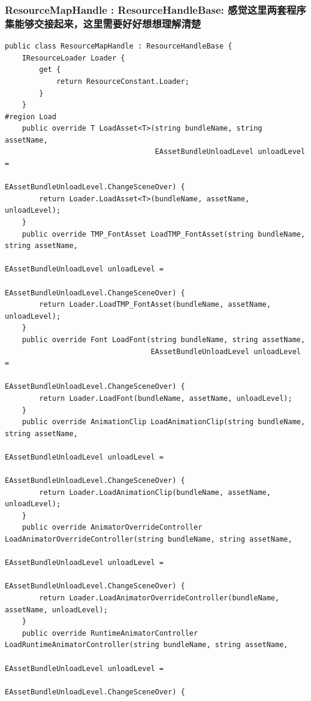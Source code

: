 \documentclass[9pt, b5paper]{article}
\begin{document}
\subsubsection{ResourceMapHandle : ResourceHandleBase: 感觉这里两套程序集能够交接起来，这里需要好好想想理解清楚}
\label{sec-9-1-3}
\begin{verbatim}
public class ResourceMapHandle : ResourceHandleBase {
    IResourceLoader Loader {
        get {
            return ResourceConstant.Loader;
        }
    }
#region Load
    public override T LoadAsset<T>(string bundleName, string assetName, 
                                   EAssetBundleUnloadLevel unloadLevel = 
                                   EAssetBundleUnloadLevel.ChangeSceneOver) {
        return Loader.LoadAsset<T>(bundleName, assetName, unloadLevel);
    }
    public override TMP_FontAsset LoadTMP_FontAsset(string bundleName, string assetName, 
                                                    EAssetBundleUnloadLevel unloadLevel = 
                                                    EAssetBundleUnloadLevel.ChangeSceneOver) {
        return Loader.LoadTMP_FontAsset(bundleName, assetName, unloadLevel);
    }
    public override Font LoadFont(string bundleName, string assetName, 
                                  EAssetBundleUnloadLevel unloadLevel = 
                                  EAssetBundleUnloadLevel.ChangeSceneOver) {
        return Loader.LoadFont(bundleName, assetName, unloadLevel);
    }
    public override AnimationClip LoadAnimationClip(string bundleName, string assetName, 
                                                    EAssetBundleUnloadLevel unloadLevel = 
                                                    EAssetBundleUnloadLevel.ChangeSceneOver) {
        return Loader.LoadAnimationClip(bundleName, assetName, unloadLevel);
    }
    public override AnimatorOverrideController LoadAnimatorOverrideController(string bundleName, string assetName, 
                                                                              EAssetBundleUnloadLevel unloadLevel = 
                                                                              EAssetBundleUnloadLevel.ChangeSceneOver) {
        return Loader.LoadAnimatorOverrideController(bundleName, assetName, unloadLevel);
    }
    public override RuntimeAnimatorController LoadRuntimeAnimatorController(string bundleName, string assetName, 
                                                                            EAssetBundleUnloadLevel unloadLevel = 
                                                                            EAssetBundleUnloadLevel.ChangeSceneOver) {

\end{verbatim}
\end{document}
